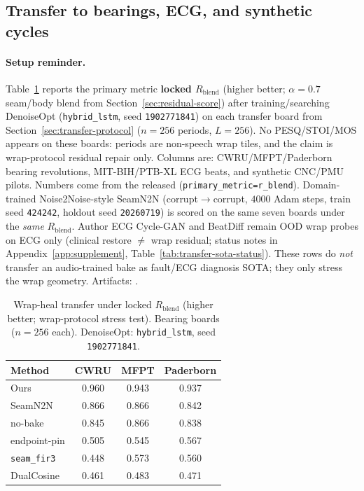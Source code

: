 \subsection{Transfer to bearings, ECG, and synthetic cycles}
\label{sec:transfer-main}

\paragraph{Setup reminder.}
Table~\ref{tab:transfer-main} reports the primary metric \textbf{locked $R_{\mathrm{blend}}$} (higher better; $\alpha{=}0.7$ seam/body blend from Section~\ref{sec:residual-score}) after training/searching DenoiseOpt
(\texttt{hybrid\_lstm}, seed \texttt{1902771841}) on each transfer board
from Section~\ref{sec:transfer-protocol} ($n{=}256$ periods, $L{=}256$).
No PESQ/STOI/MOS appears on these boards: periods are non-speech wrap tiles, and the claim is wrap-protocol residual repair only.
Columns are: CWRU/MFPT/Paderborn bearing revolutions, MIT-BIH/PTB-XL ECG beats, and synthetic CNC/PMU pilots.
Numbers come from the released
(\texttt{primary\_metric=r\_blend}).
Domain-trained Noise2Noise-style SeamN2N (corrupt$\to$corrupt, $4000$ Adam steps, train seed \texttt{424242}, holdout seed \texttt{20260719})
is scored on the same seven boards under the \emph{same} $R_{\mathrm{blend}}$.
Author ECG Cycle-GAN and BeatDiff remain OOD wrap probes on ECG only
(clinical restore $\neq$ wrap residual; status notes in Appendix~\ref{app:supplement}, Table~\ref{tab:transfer-sota-status}).
These rows do \emph{not} transfer an audio-trained bake as fault/ECG diagnosis SOTA; they only stress the wrap geometry.
Artifacts:
.

\begin{table}[t]
  \centering
  \caption{Wrap-heal transfer under locked $R_{\mathrm{blend}}$ (higher better; wrap-protocol stress test).
  Bearing boards ($n{=}256$ each). DenoiseOpt: \texttt{hybrid\_lstm}, seed \texttt{1902771841}.}
  \label{tab:transfer-main}
  \setlength{\tabcolsep}{3pt}
  \footnotesize
  \begin{tabular}{@{}lccc@{}}
    \toprule
    Method & CWRU & MFPT & Paderborn \\
    \midrule
    Ours & 0.960 & 0.943 & 0.937 \\
    SeamN2N & 0.866 & 0.866 & 0.842 \\
    no-bake & 0.845 & 0.866 & 0.838 \\
    endpoint-pin & 0.505 & 0.545 & 0.567 \\
    \texttt{seam\_fir3} & 0.448 & 0.573 & 0.560 \\
    DualCosine & 0.461 & 0.483 & 0.471 \\
    \bottomrule
  \end{tabular}
\end{table}

